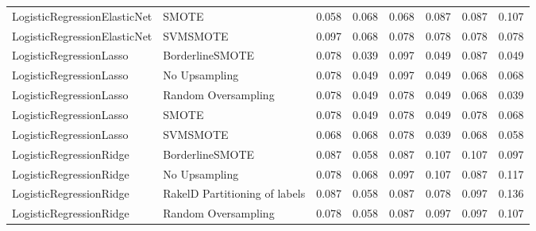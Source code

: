 \begin{tabular}{llllllll}
   LogisticRegressionElasticNet &                         SMOTE & 0.058 &                     0.068 &                 0.068 &                  0.087 &                                   0.087 &    0.107 \\
   LogisticRegressionElasticNet &                      SVMSMOTE & 0.097 &                     0.068 &                 0.078 &                  0.078 &                                   0.078 &    0.078 \\
        LogisticRegressionLasso &               BorderlineSMOTE & 0.078 &                     0.039 &                 0.097 &                  0.049 &                                   0.087 &    0.049 \\
        LogisticRegressionLasso &                 No Upsampling & 0.078 &                     0.049 &                 0.097 &                  0.049 &                                   0.068 &    0.068 \\
        LogisticRegressionLasso &           Random Oversampling & 0.078 &                     0.049 &                 0.078 &                  0.049 &                                   0.068 &    0.039 \\
        LogisticRegressionLasso &                         SMOTE & 0.078 &                     0.049 &                 0.078 &                  0.049 &                                   0.078 &    0.068 \\
        LogisticRegressionLasso &                      SVMSMOTE & 0.068 &                     0.068 &                 0.078 &                  0.039 &                                   0.068 &    0.058 \\
        LogisticRegressionRidge &               BorderlineSMOTE & 0.087 &                     0.058 &                 0.087 &                  0.107 &                                   0.107 &    0.097 \\
        LogisticRegressionRidge &                 No Upsampling & 0.078 &                     0.068 &                 0.097 &                  0.107 &                                   0.087 &    0.117 \\
        LogisticRegressionRidge & RakelD Partitioning of labels & 0.087 &                     0.058 &                 0.087 &                  0.078 &                                   0.097 &    0.136 \\
        LogisticRegressionRidge &           Random Oversampling & 0.078 &                     0.058 &                 0.087 &                  0.097 &                                   0.097 &    0.107 \\

\end{tabular}

